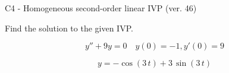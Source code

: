 \begin{exercise}
  \begin{exerciseTitle}C4 - Homogeneous second-order linear IVP (ver. 46)\end{exerciseTitle}
  \begin{exerciseStatement}
    
Find the solution to the given IVP.

    
\[y''+9y = 0 \hspace{1em} y(0) = -1 , y'(0) = 9\]

  \end{exerciseStatement}
  \begin{exerciseAnswer}
    
\[y= -\cos\left(3 \, t\right) + 3 \, \sin\left(3 \, t\right)\]

  \end{exerciseAnswer}
\end{exercise}